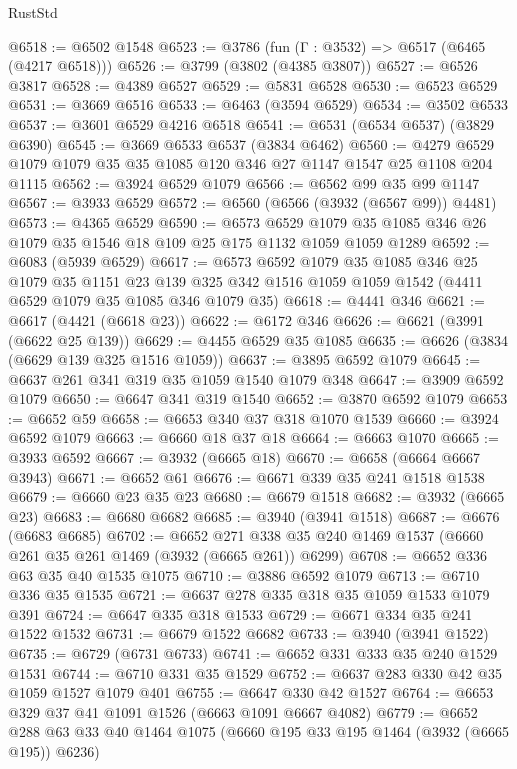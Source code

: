 \begin{lexlean}{RustStd}
\begin{coremodule}
@6518 := @6502 @1548
@6523 := @3786 (fun (Γ : @3532) => @6517 (@6465 (@4217 @6518)))
@6526 := @3799 (@3802 (@4385 @3807))
@6527 := @6526 @3817
@6528 := @4389 @6527
@6529 := @5831 @6528
@6530 := @6523 @6529
@6531 := @3669 @6516
@6533 := @6463 (@3594 @6529)
@6534 := @3502 @6533
@6537 := @3601 @6529 @4216 @6518
@6541 := @6531 (@6534 @6537) (@3829 @6390)
@6545 := @3669 @6533 @6537 (@3834 @6462)
@6560 := @4279 @6529 @1079 @1079 @35 @35 @1085 @120 @346 @27 @1147 @1547 @25 @1108 @204 @1115
@6562 := @3924 @6529 @1079
@6566 := @6562 @99 @35 @99 @1147
@6567 := @3933 @6529
@6572 := @6560 (@6566 (@3932 (@6567 @99)) @4481)
@6573 := @4365 @6529
@6590 := @6573
    @6529
    @1079
    @35
    @1085
    @346
    @26
    @1079
    @35
    @1546
    @18
    @109
    @25
    @175
    @1132
    @1059
    @1059
    @1289
@6592 := @6083 (@5939 @6529)
@6617 := @6573
    @6592
    @1079
    @35
    @1085
    @346
    @25
    @1079
    @35
    @1151
    @23
    @139
    @325
    @342
    @1516
    @1059
    @1059
    @1542
    (@4411 @6529 @1079 @35 @1085 @346 @1079 @35)
@6618 := @4441 @346
@6621 := @6617 (@4421 (@6618 @23))
@6622 := @6172 @346
@6626 := @6621 (@3991 (@6622 @25 @139))
@6629 := @4455 @6529 @35 @1085
@6635 := @6626 (@3834 (@6629 @139 @325 @1516 @1059))
@6637 := @3895 @6592 @1079
@6645 := @6637 @261 @341 @319 @35 @1059 @1540 @1079 @348
@6647 := @3909 @6592 @1079
@6650 := @6647 @341 @319 @1540
@6652 := @3870 @6592 @1079
@6653 := @6652 @59
@6658 := @6653 @340 @37 @318 @1070 @1539
@6660 := @3924 @6592 @1079
@6663 := @6660 @18 @37 @18
@6664 := @6663 @1070
@6665 := @3933 @6592
@6667 := @3932 (@6665 @18)
@6670 := @6658 (@6664 @6667 @3943)
@6671 := @6652 @61
@6676 := @6671 @339 @35 @241 @1518 @1538
@6679 := @6660 @23 @35 @23
@6680 := @6679 @1518
@6682 := @3932 (@6665 @23)
@6683 := @6680 @6682
@6685 := @3940 (@3941 @1518)
@6687 := @6676 (@6683 @6685)
@6702 := @6652 @271 @338 @35 @240 @1469 @1537 (@6660 @261 @35 @261 @1469 (@3932 (@6665 @261)) @6299)
@6708 := @6652 @336 @63 @35 @40 @1535 @1075
@6710 := @3886 @6592 @1079
@6713 := @6710 @336 @35 @1535
@6721 := @6637 @278 @335 @318 @35 @1059 @1533 @1079 @391
@6724 := @6647 @335 @318 @1533
@6729 := @6671 @334 @35 @241 @1522 @1532
@6731 := @6679 @1522 @6682
@6733 := @3940 (@3941 @1522)
@6735 := @6729 (@6731 @6733)
@6741 := @6652 @331 @333 @35 @240 @1529 @1531
@6744 := @6710 @331 @35 @1529
@6752 := @6637 @283 @330 @42 @35 @1059 @1527 @1079 @401
@6755 := @6647 @330 @42 @1527
@6764 := @6653 @329 @37 @41 @1091 @1526 (@6663 @1091 @6667 @4082)
@6779 := @6652 @288 @63 @33 @40 @1464 @1075 (@6660 @195 @33 @195 @1464 (@3932 (@6665 @195)) @6236)

\end{coremodule}
\end{lexlean}
